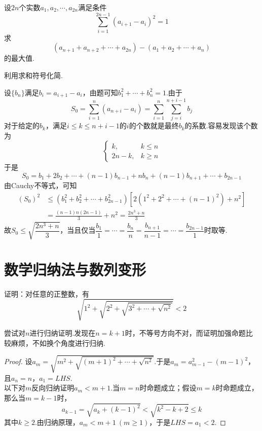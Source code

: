 \documentclass[lang=cn, zihao=4.5]{elegantbook}
\begin{document}
\begin{example} %
	设$2n$个实数$a_1,a_2, \cdots ,a_{2n}$满足条件$$\sum_{i=1}^{2n-1} (a_{i+1}-a_i)^2 = 1$$
	求$$(a_{n+1} + a_{n+2} + \cdots + a_{2n}) - (a_{1} + a_{2} + \cdots + a_{n})$$的最大值.
\end{example}
\begin{hint}
	利用求和符号化简.
\end{hint}
\begin{solution}
	设$\{ b_n \}$满足$b_i = a_{i+1} - a_i$，由题可知$b_1^2 + \cdots + b_n^2 = 1$.由于$$S_0 = \sum_{i=1}^{n} (a_{n+i} - a_i) = \sum_{i=1}^{n} \sum_{j=i}^{n+i-1} b_j$$
	对于给定的$b_k$，满足$i \leq k \leq n+i-1$的$i$的个数就是最终$b_k$的系数.容易发现该个数为$$
	\begin{cases}
		k, \quad &k \leq n \\
		2n-k, & k \geq n
	\end{cases}$$
	于是$$S_0 = b_1+2b_2 + \cdots + (n-1)b_{n-1} + nb_n + (n-1)b_{n+1} + \cdots + b_{2n-1}$$
	由Cauchy不等式，可知
	\begin{align*}
		(S_0)^2 &\leq (b_1^2+b_2^2 + \cdots + b_{2n-1}^2)[2(1^2+2^2 + \cdots + (n-1)^2)+n^2] \\
		&= \frac{(n-1)n(2n-1)}{3} + n^2 = \frac{2n^3+n}{3}
	\end{align*}
	故$S_0 \leq \sqrt{\dfrac{2n^3+n}{3}}$，当且仅当$\dfrac{b_1}{1} = \cdots = \dfrac{b_n}{n} = \dfrac{b_{n+1}}{n-1} = \cdots = \dfrac{b_{2n-1}}{1}$时取等.
\end{solution}



\section{数学归纳法与数列变形}

\begin{example} %
	证明：对任意的正整数，有$$\sqrt{1^2+ \sqrt{2^2+ \sqrt{3^2+ \cdots + \sqrt{n^2}}}}<2$$
\end{example}
\begin{hint}
	尝试对$n$进行归纳证明.发现在$n=k+1$时，不等号方向不对，而证明加强命题比较麻烦，不如换个角度进行归纳.
\end{hint}
\begin{proof}
	设$a_m = \sqrt{m^2+\sqrt{(m+1)^2 + \cdots + \sqrt{n^2}}}$.于是$a_m=a_{m-1}^2-(m-1)^2$，且$a_n=n$，$a_1=LHS$. \\
	以下对$m$反向归纳证明$a_m<m+1$.当$m=n$时命题成立；假设$m=k$时命题成立，那么当$m=k-1$时，$$a_{k-1} = \sqrt{a_k + (k-1)^2} < \sqrt{k^2-k+2} \leq k$$
	其中$k \geq 2$.由归纳原理，$a_m<m+1~(m \geq 1)$，于是$LHS=a_1 <2$.
\end{proof}
\end{document}
